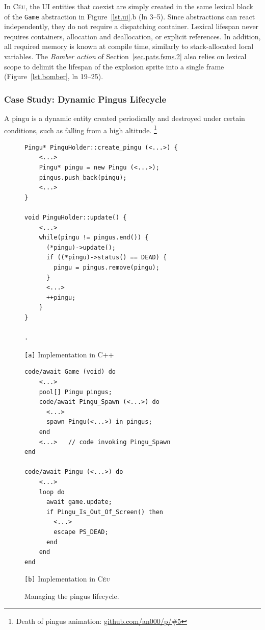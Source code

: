 \documentclass[10pt, conference, compsocconf]{IEEEtran}
\newcommand{\CEU}{\textsc{C\'{e}u}\xspace}
\newcommand{\code}[1] {{\small{\texttt{#1}}}}
\newcommand{\ax}{\code{[a]}\xspace}
\newcommand{\bx}{\code{[b]}\xspace}
\begin{document}
In \CEU, the UI entities that coexist are simply created in the same lexical
block of the \code{Game} abstraction in Figure~\ref{lst.ui}.b (ln 3--5).
%
Since abstractions can react independently, they do not require a dispatching
container.
%
Lexical lifespan never requires containers, allocation and deallocation, or
explicit references.
In addition, all required memory is known at compile time, similarly to
stack-allocated local variables.
%
The \emph{Bomber action} of Section~\ref{sec.pats.fsms.2} also relies on
lexical scope to delimit the lifespan of the explosion sprite into a single
frame (Figure~\ref{lst.bomber}, ln 19--25).

\subsubsection{Case Study: Dynamic Pingus Lifecycle}
\label{sec.pats.lifespan.2}


A pingu is a dynamic entity created periodically and destroyed under certain
conditions, such as falling from a high altitude.%
\footnote{Death of pingus animation: \url{github.com/an000/p/#5} }
%

\begin{figure}
\begin{minipage}[t]{0.50\linewidth}
\begin{lstlisting}[numbers=right]
Pingu* PinguHolder::create_pingu (<...>) {
    <...>
    Pingu* pingu = new Pingu (<...>);
    pingus.push_back(pingu);
    <...>
}

void PinguHolder::update() {
    <...>
    while(pingu != pingus.end()) {
      (*pingu)->update();
      if ((*pingu)->status() == DEAD) {
        pingu = pingus.remove(pingu);
      }
      <...>
      ++pingu;
    }
}

.
\end{lstlisting}
\centering\small{\ax Implementation in C++}
\end{minipage}
%
\begin{minipage}[t]{0.50\linewidth}
\begin{lstlisting}[xleftmargin=2em]
code/await Game (void) do
    <...>
    pool[] Pingu pingus;
    code/await Pingu_Spawn (<...>) do
      <...>
      spawn Pingu(<...>) in pingus;
    end
    <...>   // code invoking Pingu_Spawn
end

code/await Pingu (<...>) do
    <...>
    loop do
      await game.update;
      if Pingu_Is_Out_Of_Screen() then
        <...>
        escape PS_DEAD;
      end
    end
end
\end{lstlisting}
\centering\small{\bx Implementation in \CEU}
\end{minipage}
\caption{ Managing the pingus lifecycle.
\label{lst.pingus}
}
\end{figure}
\end{document}
